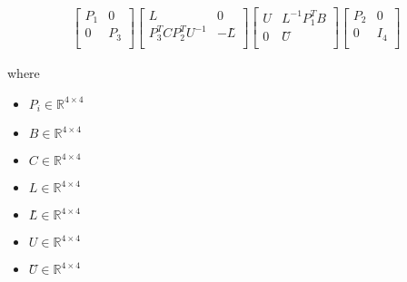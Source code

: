 \documentclass[12pt]{article}
\begin{document}
\begin{align*}
\begin{bmatrix}
\textit{P}_{ 1 } & 0\\
0 & \textit{P}_{ 3 }\\
\end{bmatrix}\begin{bmatrix}
\textit{L} & 0\\
\textit{P}_{ 3 }^T\textit{C}\textit{P}_{ 2 }^T\textit{U}^{-1} & -\textit{L̃}\\
\end{bmatrix}\begin{bmatrix}
\textit{U} & \textit{L}^{-1}\textit{P}_{ 1 }^T\textit{B}\\
0 & \textit{Ũ}\\
\end{bmatrix}\begin{bmatrix}
\textit{P}_{ 2 } & 0\\
0 & I_{ 4 }\\
\end{bmatrix}
\end{align*}

where
\begin{itemize}
\item $\textit{P}_{\textit{i}} \in \mathbb{R}^{ 4 \times 4 }$
\item $\textit{B} \in \mathbb{R}^{ 4 \times 4 }$
\item $\textit{C} \in \mathbb{R}^{ 4 \times 4 }$
\item $\textit{L} \in \mathbb{R}^{ 4 \times 4 }$
\item $\textit{L̃} \in \mathbb{R}^{ 4 \times 4 }$
\item $\textit{U} \in \mathbb{R}^{ 4 \times 4 }$
\item $\textit{Ũ} \in \mathbb{R}^{ 4 \times 4 }$
\end{itemize}
\end{document}
